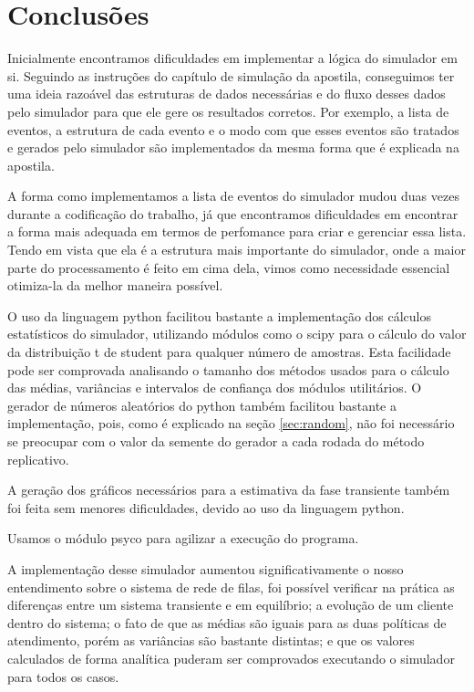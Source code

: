 \chapter{Conclusões}

Inicialmente encontramos dificuldades em implementar a lógica do simulador em si. Seguindo as instruções do capítulo de simulação da apostila, conseguimos ter uma ideia razoável das estruturas de dados necessárias e do fluxo desses dados pelo simulador para que ele gere os resultados corretos. Por exemplo, a lista de eventos, a estrutura de cada evento e o modo com que esses eventos são tratados e gerados pelo simulador são implementados da mesma forma que é explicada na apostila.

A forma como implementamos a lista de eventos do simulador mudou duas vezes durante a codificação do trabalho, já que encontramos dificuldades em encontrar a forma mais adequada em termos de perfomance para criar e gerenciar essa lista. Tendo em vista que ela é a estrutura mais importante do simulador, onde a maior parte do processamento é feito em cima dela, vimos como necessidade essencial otimiza-la da melhor maneira possível.

O uso da linguagem python facilitou bastante a implementação dos cálculos estatísticos do simulador, utilizando módulos como o scipy para o cálculo do valor da distribuição t de student para qualquer número de amostras. Esta facilidade pode ser comprovada analisando o tamanho dos métodos usados para o cálculo das médias, variâncias e intervalos de confiança dos módulos utilitários. O gerador de números aleatórios do python também facilitou bastante a implementação, pois, como é explicado na seção \ref{sec:random}, não foi necessário se preocupar com o valor da semente do gerador a cada rodada do método replicativo.

A geração dos gráficos necessários para a estimativa da fase transiente também foi feita sem menores dificuldades, devido ao uso da linguagem python.

Usamos o módulo psyco para agilizar a execução do programa. 

A implementação desse simulador aumentou significativamente o nosso entendimento sobre o sistema de rede de filas, foi possível verificar na prática as diferenças entre um sistema transiente e em equilíbrio; a evolução de um cliente dentro do sistema; o fato de que as médias são iguais para as duas políticas de atendimento, porém as variâncias são bastante distintas; e que os valores calculados de forma analítica puderam ser comprovados executando o simulador para todos os casos.